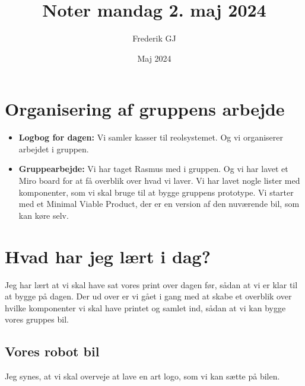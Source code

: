 \documentclass{article}
\title{Noter mandag 2. maj 2024}
\author{Frederik GJ}
\date{Maj 2024}
\begin{document}
\maketitle

\section{Organisering af gruppens arbejde}

\begin{itemize}
    \item \textbf{Logbog for dagen:} Vi samler kasser til reolsystemet. Og vi organiserer arbejdet i gruppen. 
    \item \textbf{Gruppearbejde:} Vi har taget Rasmus med i gruppen. Og vi har lavet et Miro board for at få overblik over hvad vi laver. Vi har lavet nogle lister med komponenter, som vi skal bruge til at bygge gruppens prototype. Vi starter med et Minimal Viable Product, der er en version af den nuværende bil, som kan køre selv. 
    
\end{itemize}

\section{Hvad har jeg lært i dag?}
Jeg har lært at vi skal have sat vores print over dagen før, sådan at vi er klar til at bygge på dagen. Der ud over er vi gået i gang med at skabe et overblik over hvilke komponenter vi skal have printet og samlet ind, sådan at vi kan bygge vores gruppes bil. 

\subsection{Vores robot bil}
Jeg synes, at vi skal overveje at lave en art logo, som vi kan sætte på bilen. 
\end{document}
